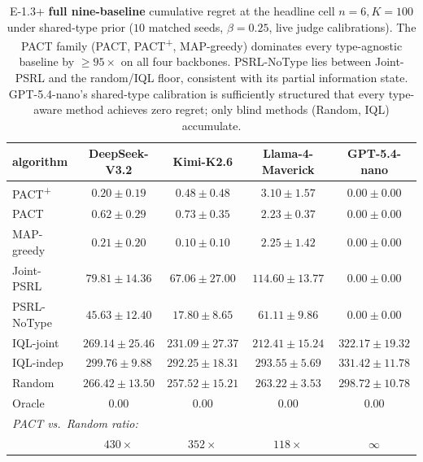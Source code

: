 \begin{table}[t]
\centering
\caption{E-1.3+ \textbf{full nine-baseline} cumulative regret at the headline cell $n{=}6, K{=}100$ under shared-type prior ($10$ matched seeds, $\beta{=}0.25$, live judge calibrations). The PACT family (PACT, PACT\textsuperscript{+}, MAP-greedy) dominates every type-agnostic baseline by $\geq\!95\times$ on all four backbones. PSRL-NoType lies between Joint-PSRL and the random/IQL floor, consistent with its partial information state. GPT-5.4-nano's shared-type calibration is sufficiently structured that every type-aware method achieves zero regret; only blind methods (Random, IQL) accumulate.}\label{tab:wave2-lb-allbaselines}
\small
\setlength{\tabcolsep}{4pt}
\begin{tabular}{lcccc}
\toprule
algorithm & DeepSeek-V3.2 & Kimi-K2.6 & Llama-4-Maverick & GPT-5.4-nano \\
\midrule
PACT\textsuperscript{+}   & $0.20 \pm 0.19$  & $0.48 \pm 0.48$  & $3.10 \pm 1.57$   & $0.00 \pm 0.00$ \\
PACT                       & $0.62 \pm 0.29$  & $0.73 \pm 0.35$  & $2.23 \pm 0.37$   & $0.00 \pm 0.00$ \\
MAP-greedy                 & $0.21 \pm 0.20$  & $0.10 \pm 0.10$  & $2.25 \pm 1.42$   & $0.00 \pm 0.00$ \\
Joint-PSRL                 & $79.81 \pm 14.36$& $67.06 \pm 27.00$& $114.60 \pm 13.77$ & $0.00 \pm 0.00$ \\
PSRL-NoType                & $45.63 \pm 12.40$& $17.80 \pm 8.65$ & $61.11 \pm 9.86$  & $0.00 \pm 0.00$ \\
IQL-joint                  & $269.14 \pm 25.46$& $231.09 \pm 27.37$& $212.41 \pm 15.24$& $322.17 \pm 19.32$ \\
IQL-indep                  & $299.76 \pm 9.88$& $292.25 \pm 18.31$& $293.55 \pm 5.69$ & $331.42 \pm 11.78$ \\
Random                     & $266.42 \pm 13.50$& $257.52 \pm 15.21$& $263.22 \pm 3.53$ & $298.72 \pm 10.78$ \\
Oracle                     & $0.00$           & $0.00$           & $0.00$            & $0.00$ \\
\midrule
\multicolumn{5}{l}{\emph{PACT vs.\ Random ratio:}} \\
                           & $430\times$       & $352\times$       & $118\times$       & $\infty$ \\
\bottomrule
\end{tabular}
\end{table}

